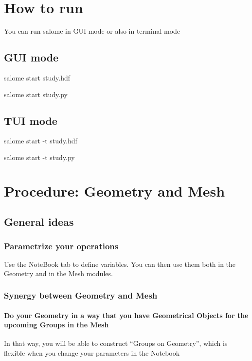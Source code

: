 \documentclass[10pt]{book}
\begin{document}
  
 
\chapter{How to run}

 You can run salome in GUI mode or also in terminal mode

 \section{GUI mode}
  
 salome start study.hdf
 
 salome start study.py

 \section{TUI mode}
 
 salome start -t study.hdf
 
 salome start -t study.py
 
 
  
  
 \chapter{Procedure: Geometry and Mesh}

   \section{General ideas}
   
   
 \subsection{Parametrize your operations}

    Use the NoteBook tab to define variables. You can then use them both in the Geometry and in the Mesh modules.

 \subsection{Synergy between Geometry and Mesh}
 
 
 \subsubsection{Do your Geometry in a way that you have Geometrical Objects for the upcoming Groups in the Mesh}
 
  In that way, you will be able to construct ``Groups on Geometry'', which is flexible when you change your parameters in the Notebook
  
\end{document}
